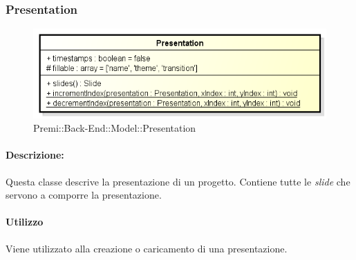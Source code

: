 \subsubsection{Presentation}

	\begin{figure}[h]
		\centering
		\includegraphics[width=0.8\linewidth]{img/back_end_premi_model_presentation}
		\caption[Premi::Back-End::Model::Presentation]{Premi::Back-End::Model::Presentation}
		\label{fig:back_end_premi_model_presentation}
	\end{figure}


	\paragraph{Descrizione:}
	Questa classe descrive la presentazione di un progetto. Contiene tutte le \textit{\gls{slide}} che servono a comporre la presentazione.

	\paragraph{Utilizzo}
	Viene utilizzato alla creazione o caricamento di una presentazione.
	
